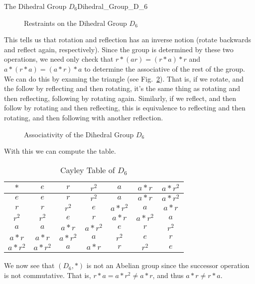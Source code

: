 \begin{lexample}{The Dihedral Group $D_{6}$}{Dihedral_Group_D_6}
        \begin{figure}[H]
            \centering
            \captionsetup{type=figure}
            \resizebox{\textwidth}{!}{%
                
            }
            \caption{Restraints on the Dihedral Group $D_{6}$}
            \label{fig:Restraints_on_D_6}
        \end{figure}
        This tells us that rotation and reflection has an inverse notion
        (rotate backwards and reflect again, respectively). Since the group is
        determined by these two operations, we need only check that
        $r*(ar)=(r*a)*r$ and $a*(r*a)=(a*r)*a$ to determine the associative of
        the rest of the group. We can do this by examing the triangle
        (see Fig.~\ref{fig:Assoc_of_Dihedral_Group_D6}). That is, if we
        rotate, and the follow by reflecting and then rotating, it's the same
        thing as rotating and then reflecting, following by rotating again.
        Similarly, if we reflect, and then follow by rotating and then
        reflecting, this is equivalence to reflecting and then rotating, and
        then following with another reflection.
        \begin{figure}[H]
            \centering
            \captionsetup{type=figure}
            \resizebox{\textwidth}{!}{%
                
            }
            \caption{Associativity of the Dihedral Group $D_{6}$}
            \label{fig:Assoc_of_Dihedral_Group_D6}
        \end{figure}
        With this we can compute the table.
        \begin{table}[H]
            \centering
            \captionsetup{type=table}
            \begin{tabular}{c|cccccc}
                $*$&$e$&$r$&$r^{2}$&$a$&$a*r$&$a*r^{2}$\\
                \hline
                $e$&$e$&$r$&$r^{2}$&$a$&$a*r$&$a*r^{2}$\\
                $r$&$r$&$r^{2}$&$e$&$a*r^{2}$&$a$&$a*r$\\
                $r^{2}$&$r^{2}$&$e$&$r$&$a*r$&$a*r^{2}$&$a$\\
                $a$&$a$&$a*r$&$a*r^{2}$&$e$&$r$&$r^{2}$\\
                $a*r$&$a*r$&$a*r^{2}$&$a$&$r^{2}$&$e$&$r$\\
                $a*r^{2}$&$a*r^{2}$&$a$&$a*r$&$r$&$r^{2}$&$e$
            \end{tabular}
            \caption{Cayley Table of $D_{6}$}
            \label{tab:Cayley_Table_D_6}
        \end{table}
        We now see that $(D_{6},*)$ is not an Abelian group since the successor
        operation is not commutative. That is, $r*a=a*r^{2}\ne{a}*r$, and thus
        $a*r\ne{r}*a$.
    \end{lexample}
